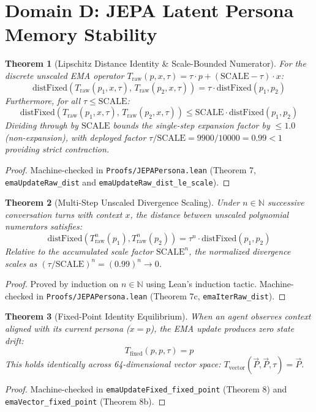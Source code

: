 \documentclass[11pt,a4paper]{article}
\theoremstyle{plain}
\newtheorem{theorem}{Theorem}[section]
\theoremstyle{definition}
\theoremstyle{remark}
\begin{document}
\section{Domain D: JEPA Latent Persona Memory Stability}

\begin{theorem}[Lipschitz Distance Identity \& Scale-Bounded Numerator]
\label{thm:jepa_contraction}
For the discrete unscaled EMA operator $T_{\text{raw}}(p, x, \tau) = \tau \cdot p + (\text{SCALE} - \tau) \cdot x$:
\begin{equation}
    \text{distFixed}(T_{\text{raw}}(p_1, x, \tau),\, T_{\text{raw}}(p_2, x, \tau)) = \tau \cdot \text{distFixed}(p_1, p_2)
\end{equation}
Furthermore, for all $\tau \le \text{SCALE}$:
\begin{equation}
    \text{distFixed}(T_{\text{raw}}(p_1, x, \tau),\, T_{\text{raw}}(p_2, x, \tau)) \le \text{SCALE} \cdot \text{distFixed}(p_1, p_2)
\end{equation}
Dividing through by $\text{SCALE}$ bounds the single-step expansion factor by $\le 1.0$ (non-expansion), with deployed factor $\tau / \text{SCALE} = 9900/10000 = 0.99 < 1$ providing strict contraction.
\end{theorem}
\begin{proof}
Machine-checked in \texttt{Proofs/JEPAPersona.lean} (Theorem 7, \texttt{emaUpdateRaw\_dist} and \texttt{emaUpdateRaw\_dist\_le\_scale}).
\end{proof}

\begin{theorem}[Multi-Step Unscaled Divergence Scaling]
\label{thm:jepa_multistep}
Under $n \in \mathbb{N}$ successive conversation turns with context $x$, the distance between unscaled polynomial numerators satisfies:
\begin{equation}
    \text{distFixed}(T_{\text{raw}}^n(p_1), T_{\text{raw}}^n(p_2)) = \tau^n \cdot \text{distFixed}(p_1, p_2)
\end{equation}
Relative to the accumulated scale factor $\text{SCALE}^n$, the normalized divergence scales as $(\tau / \text{SCALE})^n = (0.99)^n \to 0$.
\end{theorem}
\begin{proof}
Proved by induction on $n \in \mathbb{N}$ using Lean's induction tactic. Machine-checked in \texttt{Proofs/JEPAPersona.lean} (Theorem 7c, \texttt{emaIterRaw\_dist}).
\end{proof}

\begin{theorem}[Fixed-Point Identity Equilibrium]
\label{thm:jepa_fixedpoint}
When an agent observes context aligned with its current persona ($x = p$), the EMA update produces zero state drift:
\begin{equation}
    T_{\text{fixed}}(p, p, \tau) = p
\end{equation}
This holds identically across 64-dimensional vector space: $T_{\text{vector}}(\vec{P}, \vec{P}, \tau) = \vec{P}$.
\end{theorem}
\begin{proof}
Machine-checked in \texttt{emaUpdateFixed\_fixed\_point} (Theorem 8) and \texttt{emaVector\_fixed\_point} (Theorem 8b).
\end{proof}
\end{document}
